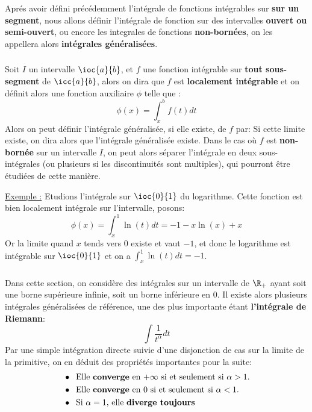 \chapter*{}
Aprés avoir défini précédemment l'intégrale de fonctions intégrables sur \textbf{sur un segment}, nous allons définir l'intégrale de fonction sur des intervalles \textbf{ouvert ou semi-ouvert}, ou encore les integrales de fonctions \textbf{non-bornées}, on les appellera alors \textbf{intégrales généralisées}.
\subsection*{}
Soit \(I\) un intervalle \(\ioc{a}{b}\), et \(f\) une fonction intégrable sur \textbf{tout sous-segment} de \(\icc{a}{b}\), alors on dira que \(f\) est \textbf{localement intégrable} et on définit alors une fonction auxiliaire \(\phi\) telle que :
\[
   \phi(x) = \int_{x}^{b} f(t) d t
\]
Alors on peut définir l'intégrale généralisée, si elle existe, de \(f\) par:
Si cette limite existe, on dira alors que l'intégrale généralisée existe.\+ 
Dans le cas où \(f\) est \textbf{non-bornée} sur un intervalle \(I\), on peut alors séparer l'intégrale en deux sous-intégrales (ou plusieurs si les discontinuités sont multiples), qui pourront être étudiées de cette manière.\<

\underline{Exemple :} Etudions l'intégrale sur \(\ioc{0}{1}\) du logarithme. Cette fonction est bien localement intégrale sur l'intervalle, posons:
\[
   \phi(x) = \int_{x}^{1} \ln(t) d t = - 1 - x\ln(x) + x 
\]
Or la limite quand \(x\) tends vers \(0\) existe et vaut \(-1\), et donc le logarithme est intégrable sur \(\ioc{0}{1}\) et on a \(\int_{x}^{1} \ln(t) d t = -1\).
\subsection*{}
Dans cette section, on considère des intégrales sur un intervalle de \(\R_+\) ayant soit une borne supérieure infinie, soit un borne inférieure en 0.\+
Il existe alors plusieurs intégrales généralisées de référence, une des plus importante étant \textbf{l'intégrale de Riemann}:
\[
   \int \frac{1}{t^\alpha} d t   
\]
Par une simple intégration directe suivie d'une disjonction de cas sur la limite de la primitive, on en déduit des propriétés importantes pour la suite:
\begin{align*}
   &\bullet \;\; \text{Elle \textbf{converge} en \(+\infty\) si et seulement si \(\alpha > 1\).} \\
   &\bullet \;\; \text{Elle \textbf{converge} en \(0\) si et seulement si \(\alpha < 1\).} \\
   &\bullet \;\; \text{Si \(\alpha = 1\), elle \textbf{diverge toujours}}
\end{align*}

